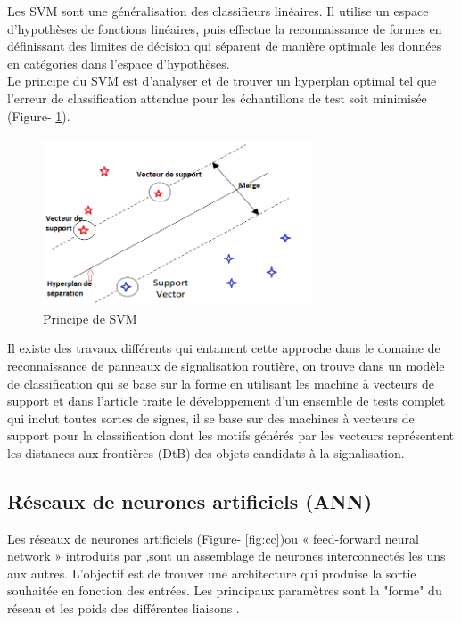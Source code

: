 Les SVM sont une généralisation des classifieurs linéaires. Il utilise un espace d'hypothèses de fonctions linéaires, puis effectue la reconnaissance de formes en définissant des limites de décision qui séparent de manière optimale les données en catégories dans l'espace d'hypothèses.\\
Le principe du SVM est d’analyser et de trouver un hyperplan optimal tel que l’erreur de classification attendue pour les échantillons de test soit minimisée (Figure- \ref{fig:prin}).
\begin{figure}[h!]
      \centering
      \includegraphics[width=8cm,height=5cm]{images/capt2.png}
    \caption{Principe de SVM}
    \label{fig:prin}
\end{figure}

Il existe des travaux différents qui entament cette approche dans le domaine de reconnaissance de panneaux de signalisation routière, on trouve dans \cite{33} un modèle de classification qui se base sur la forme en utilisant les machine à vecteurs de support et dans \cite{34} l’article traite le développement d’un ensemble de tests complet qui inclut toutes sortes de signes, il se base sur des machines à vecteurs de support pour la classification dont les motifs générés par les vecteurs représentent les distances aux frontières (DtB) des objets candidats à la signalisation.

\subsection{Réseaux de neurones artificiels (ANN)}

Les réseaux de neurones artificiels (Figure- \ref{fig:cc})ou « feed-forward neural network » introduits par \cite{35},sont un assemblage de neurones interconnectés les uns aux autres. L'objectif est de trouver une architecture qui produise la sortie souhaitée en fonction des entrées. Les principaux paramètres sont la "forme" du réseau et les poids des différentes liaisons \cite{36}.

